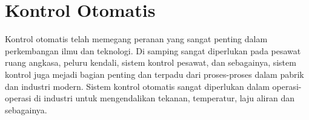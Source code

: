 









\section{Kontrol Otomatis}

Kontrol otomatis telah memegang peranan yang sangat penting dalam perkembangan ilmu dan teknologi. Di samping sangat diperlukan pada pesawat ruang angkasa, peluru kendali, sistem kontrol pesawat, dan sebagainya, sistem kontrol juga mejadi bagian penting dan terpadu dari proses-proses dalam pabrik dan industri modern. Sistem kontrol otomatis sangat diperlukan dalam operasi-operasi di industri untuk mengendalikan tekanan, temperatur, laju aliran dan sebagainya.

